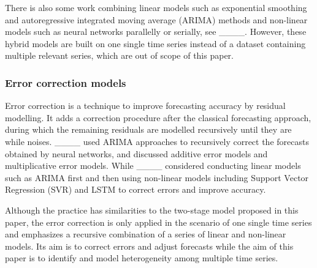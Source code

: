    There is also some work combining linear models such as exponential smoothing and autoregressive integrated moving average (ARIMA) methods and non-linear models such as neural networks parallelly or serially, see ____. However, these hybrid models are built on one single time series instead of a dataset containing multiple relevant series, which are out of scope of this paper.
    
    \subsubsection{Error correction models}
    Error correction is a technique to improve forecasting accuracy by residual modelling. It adds a correction procedure after the classical forecasting approach, during which the remaining residuals are modelled recursively until they are while noises. ____ used ARIMA approaches to recursively correct the forecasts obtained by neural networks, and discussed additive error models and multiplicative error models. While ____ considered conducting linear models such as ARIMA first and then using non-linear models including Support Vector Regression (SVR) and LSTM to correct errors and improve accuracy.
    
    Although the practice has similarities to the two-stage model proposed in this paper, the error correction is only applied in the scenario of one single time series and emphasizes a recursive combination of a series of linear and non-linear models. Its aim is to correct errors and adjust forecasts while the aim of this paper is to identify and model heterogeneity among multiple time series.